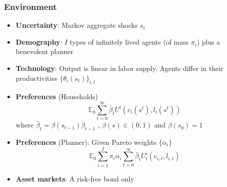 \documentclass{beamer}
\begin{document}
\begin{frame}
 \frametitle{Environment}
 \begin{itemize}
 \item \textbf{Uncertainty}: Markov aggregate shocks $s_t$
  \item \textbf{Demography}: $I$ types of infinitely lived agents (of mass $\pi_i$)  plus a benevolent planner
  \item \textbf{Technology}: Output is linear in labor supply. Agents differ in their productivities $\{\theta_i(s_t)\}_{i,t}$
  \item \textbf{Preferences }(Households)
  \begin{equation*}
\mathbb{E}_{0}\sum_{t=0}^{\infty } \bar{\beta}_t  U^{i}\left(
c_{i}(s^t),l_{i}(s^t)\right)  \label{utility lifetime}
\end{equation*}%
where $\bar{\beta}_t=\beta(s_{t-1}) \bar{\beta}_{t-1}$ , $\beta(s)\in (0,1)$ and  $\beta(s_0)=1$
\item \textbf{Preferences} (Planner): Given Pareto weights $\{\alpha_i\}$
\begin{equation*}
\mathbb{E}_{0}\sum_{i=1}^{I}\pi _{i}\alpha _{i}\sum_{t=0}^{\infty }\bar{\beta}_t U_{t}^{i}\left( c_{i,t},l_{i,t}\right)  \label{govmt objective}
\end{equation*}
  \item \textbf{Asset markets}: A risk-free bond only
  \end{itemize}

\end{frame}
\end{document}
